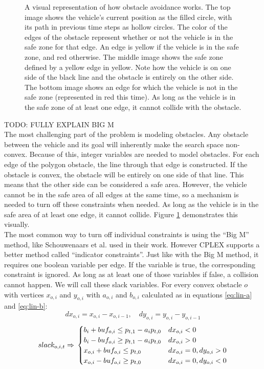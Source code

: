 \begin{figure}[!t]
\begin{subfigure}[t]{0.47\textwidth}
        \caption{}
    \end{subfigure}
    \caption{A visual representation of how obstacle avoidance works. The top image shows the vehicle's current position as the filled circle, with its path in previous time steps as hollow circles. The color of the edges of the obstacle represent whether or not the vehicle is in the safe zone for that edge. An edge is yellow if the vehicle is in the safe zone, and red otherwise. The middle image shows the safe zone defined by a yellow edge in yellow. Note how the vehicle is on one side of the black line and the obstacle is entirely on the other side. The bottom image shows an edge for which the vehicle is not in the safe zone (represented in red this time). As long as the vehicle is in the safe zone of at least one edge, it cannot collide with the obstacle.}\label{fig:obs}
\end{figure}
TODO: FULLY EXPLAIN BIG M\\
The most challenging part of the problem is modeling obstacles. Any obstacle between the vehicle and its goal will inherently make the search space non-convex. Because of this, integer variables are needed to model obstacles. For each edge of the polygon obstacle, the line through that edge is constructed. If the obstacle is convex, the obstacle will be entirely on one side of that line. This means that the other side can be considered a safe area. However, the vehicle cannot be in the safe area of all edges at the same time, so a mechanism is needed to turn off these constraints when needed. As long as the vehicle is in the safe area of at least one edge, it cannot collide.  Figure \ref{fig:obs} demonstrates this visually. \\
The most common way to turn off individual constraints is using the ``Big M'' method, like Schouwenaars et al. \cite{Schouwenaars2001} used in their work. However CPLEX supports a better method called ``indicator constraints''. Just like with the Big M method, it requires one boolean variable per edge. If the variable is true, the corresponding constraint is ignored. As long as at least one of those variables if false, a collision cannot happen. We will call these slack variables. For every convex obstacle $o$ with vertices $x_{o,i}$ and $y_{o,i}$ with $a_{o,i}$ and $b_{o,i}$ calculated as in equations \ref{eq:lin-a} and \ref{eq:lin-b}:
\begin{equation*}
dx_{o,i} = x_{o,i} - x_{o,i-1}, \quad dy_{o,i} = y_{o,i} - y_{o,i-1}
\end{equation*}
\begin{equation}
\label{eq:obs}
slack_{o,i,t} \Rightarrow \\
\begin{cases}
b_i + buf_{o,i} \leq p_{t,1} - a_i p_{t,0} & dx_{o,i} < 0 \\
b_i - buf_{o,i}  \geq p_{t,1} - a_i p_{t,0} & dx_{o,i} > 0 \\
x_{o,i} + buf_{o,i}  \leq p_{t,0} & dx_{o,i} = 0, dy_{o,i} > 0 \\
x_{o,i} - buf_{o,i}  \geq p_{t,0} & dx_{o,i} = 0, dy_{o,i} < 0 \\
\end{cases}
\end{equation}
